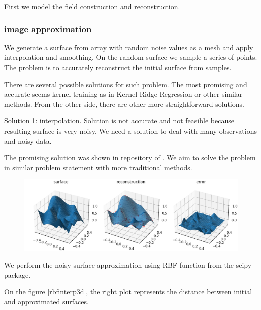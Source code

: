 First we model the field construction and reconstruction. 

\subsubsection{image approximation}

We generate a surface from array with random noise values as a mesh and apply interpolation and smoothing.
On the random surface we sample a series of points. The problem is to accurately reconstruct the initial surface from samples.

There are  several possible solutions for such problem. The most promising and accurate seems kernel training as in Kernel Ridge Regression or other similar methods. From the other side, there are other more straightforward solutions.

Solution 1: interpolation. Solution is not accurate and not feasible because resulting surface is very noisy. We need a solution to deal with many observations and noisy data.

The promising solution was shown in repository of \cite{Surface_approximation_GP}. We aim to solve the problem in similar problem statement with more traditional methods.

\begin{figure}
	\centering
	\includegraphics[width=1.0\linewidth]{images/rbfinterp3d}
	\caption{}
	\label{fig:rbfinterp3d}
\end{figure}

We perform the noisy surface approximation using RBF function from the scipy package.

On the figure \ref{rbfinterp3d}, the right plot represents the distance between initial and approximated surfaces.